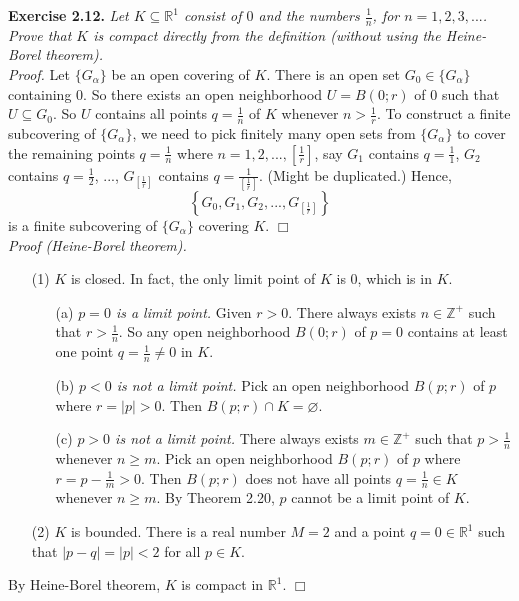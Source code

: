 \documentclass{article}
\begin{document}



\textbf{Exercise 2.12.}
\emph{Let $K \subseteq \mathbb{R}^1$
consist of $0$ and the numbers $\frac{1}{n}$, for $n = 1, 2, 3, ...$.
Prove that $K$ is compact directly from the definition
(without using the Heine-Borel theorem).} \\

\emph{Proof.}
Let $\{ G_{\alpha} \}$ be an open covering of $K$.
There is an open set $G_0 \in \{ G_{\alpha} \}$ containing $0$.
So there exists an open neighborhood $U = B(0;r)$ of $0$ such that $U \subseteq G_0$.
So $U$ contains all points $q = \frac{1}{n}$ of $K$ whenever $n > \frac{1}{r}$.
To construct a finite subcovering of $\{ G_{\alpha} \}$,
we need to pick finitely many open sets from $\{ G_{\alpha} \}$
to cover the remaining points $q = \frac{1}{n}$ where $n = 1, 2, ..., \left[\frac{1}{r}\right]$,
say $G_1$ contains $q = \frac{1}{1}$, $G_2$ contains $q = \frac{1}{2}$, ...,
$G_{\left[\frac{1}{r}\right]}$ contains $q = \frac{1}{\left[\frac{1}{r}\right]}$.
(Might be duplicated.)
Hence,
$$\left\{ G_0, G_1, G_2, ..., G_{\left[\frac{1}{r}\right]} \right\}$$
is a finite subcovering of $\{ G_{\alpha} \}$ covering $K$.
$\Box$ \\

\emph{Proof (Heine-Borel theorem).}
\begin{enumerate}
\item[(1)]
$K$ is closed. In fact, the only limit point of $K$ is $0$, which is in $K$.
\begin{enumerate}
\item[(a)]
\emph{$p = 0$ is a limit point.}
Given $r > 0$.
There always exists $n \in \mathbb{Z}^{+}$ such that $r > \frac{1}{n}$.
So any open neighborhood $B(0;r)$ of $p = 0$
contains at least one point $q = \frac{1}{n} \neq 0$ in $K$.
\item[(b)]
\emph{$p < 0$ is not a limit point.}
Pick an open neighborhood $B(p;r)$ of $p$ where $r = |p| > 0$.
Then $B(p;r) \cap K = \varnothing$.
\item[(c)]
\emph{$p > 0$ is not a limit point.}
There always exists $m \in \mathbb{Z}^+$ such that $p > \frac{1}{n}$ whenever $n \geq m$.
Pick an open neighborhood $B(p;r)$ of $p$ where $r = p - \frac{1}{m} > 0$.
Then $B(p;r)$ does not have all points $q = \frac{1}{n} \in K$ whenever $n \geq m$.
By Theorem 2.20, $p$ cannot be a limit point of $K$.
\end{enumerate}
\item[(2)]
$K$ is bounded. There is a real number $M = 2$ and a point $q = 0 \in \mathbb{R}^1$
such that $|p - q| = |p| < 2$ for all $p \in K$.
\end{enumerate}
By Heine-Borel theorem, $K$ is compact in $\mathbb{R}^1$.
$\Box$ \\\\
\end{document}
